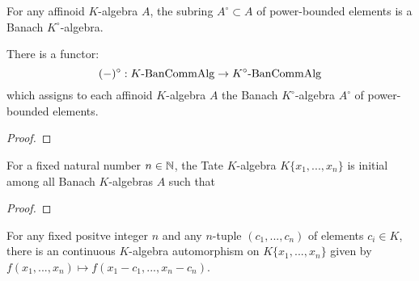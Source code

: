             \begin{lemma} \label{lemma: power_bounded_subrings_of_affinoid_algebras_are_banach}
                For any affinoid $K$-algebra $A$, the subring $A^{\circ} \subset A$ of power-bounded elements is a Banach $K^{\circ}$-algebra.
            \end{lemma}
            \begin{proposition} \label{prop: unit_discs_are_mapped_to_unit_discs}
                There is a functor:
                    $$(-)^{\circ}: K\text{-}\mathrm{Ban}\mathrm{Comm}\mathrm{Alg} \to K^{\circ}\text{-}\mathrm{Ban}\mathrm{Comm}\mathrm{Alg}$$
                which assigns to each affinoid $K$-algebra $A$ the Banach $K^{\circ}$-algebra $A^{\circ}$ of power-bounded elements. 
            \end{proposition}
                \begin{proof}
                    
                \end{proof}
            \begin{proposition} \label{prop: tate_algebras_are_free_affinoid_algebras}
                For a fixed natural number $n \in \mathbb{N}$, the Tate $K$-algebra $K\{x_1, ..., x_n\}$ is initial among all Banach $K$-algebras $A$ such that 
            \end{proposition}
                \begin{proof}
                    
                \end{proof}
            \begin{corollary} \label{coro: recentering_tate_algebras_over_non_archimedean_fields_is_an_automorphism}
                For any fixed positve integer $n$ and any $n$-tuple $(c_1, ..., c_n)$ of elements $c_i \in K$, there is an continuous $K$-algebra automorphism on $K\{x_1, ..., x_n\}$ given by $f(x_1, ..., x_n) \mapsto f(x_1 - c_1, ..., x_n - c_n)$.
            \end{corollary}
            
